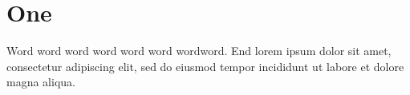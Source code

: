 \documentclass{article}
\begin{document}
\section{One}
Word \label{a} word word\label{b} word word \label{c}word word\label{d}word. End \label{e}
\label{f} lorem ipsum dolor sit amet, consectetur adipiscing elit, sed do eiusmod tempor incididunt ut labore et dolore magna aliqua.
\end{document}
